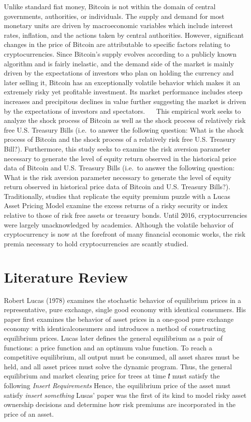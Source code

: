 \documentclass[]{article}
\begin{document}
Unlike standard fiat money, Bitcoin is not within the domain of central
governments, authorities, or individuals. The supply and demand for most
monetary units are driven by macroeconomic variables which include
interest rates, inflation, and the actions taken by central authorities.
However, significant changes in the price of Bitcoin are attributable to
specific factors relating to cryptocurrencies. Since Bitcoin's supply
evolves according to a publicly known algorithm and is fairly inelastic,
and the demand side of the market is mainly driven by the expectations
of investors who plan on holding the currency and later selling it,
Bitcoin has an exceptionally volatile behavior which makes it an
extremely risky yet profitable investment. Its market performance
includes steep increases and precipitous declines in value further
suggesting the market is driven by the expectations of investors and
spectators.   This empirical work seeks to analyze the shock process of
Bitcoin as well as the shock process of relatively risk free U.S.
Treasury Bills (i.e.~to answer the following question: What is the shock
process of Bitcoin and the shock process of a relatively risk free U.S.
Treasury Bill?). Furthermore, this study seeks to examine the risk
aversion parameter necessary to generate the level of equity return
observed in the historical price data of Bitcoin and U.S. Treasury Bills
(i.e.~to answer the following question: What is the risk aversion
parameter necessary to generate the level of equity return observed in
historical price data of Bitcoin and U.S. Treasury Bills?).
Traditionally, studies that replicate the equity premium puzzle with a
Lucas Asset Pricing Model examine the excess returns of a risky security
or index relative to those of risk free assets or treasury bonds. Until
2016, cryptocurrencies were largely unacknowledged by academics.
Although the volatile behavior of cryptocurrency is now at the forefront
of many financial economic works, the risk premia necessary to hold
cryptocurrencies are scantly studied.

\section{Literature Review}\label{literature-review}

Robert Lucas (1978) examines the stochastic behavior of equilibrium
prices in a representative, pure exchange, single good economy with
identical consumers. His paper first examines the behavior of asset
prices in a one-good pure exchange economy with identicalconsumers and
introduces a method of constructing equilibrium prices. Lucas later
defines the general equilibrium as a pair of functions: a price function
and an optimum value function. To reach a competitive equilibrium, all
output must be consumed, all asset shares must be held, and all asset
prices must solve the dynamic program. Thus, the general equilibrium and
market clearing price for trees at time 𝑡 must satisfy the following
\emph{Insert Requirements} Hence, the equilibrium price of the asset
must satisfy \emph{insert something} Lusas' paper was the first of its
kind to model risky asset ownership decisions and determine how risk
premiums are incorporated in the price of an asset.
\end{document}
